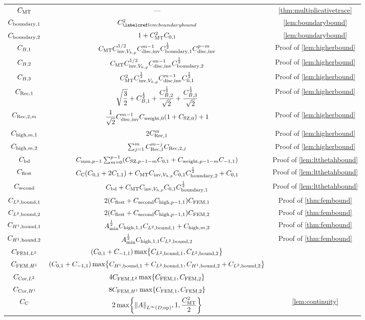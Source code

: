 \begin{longtabu}{ccc}
  $C_{\mathrm{MT}}$ &---&\cref{thm:multiplicativetrace}\\
  $C_{\mathrm{boundary},1}$ & $\Cmess^2$ & \cref{lem:boundarybound} \\
  $C_{\mathrm{boundary},2}$ & $1 + C_{\mathrm{MT}}^2 C_{0,1}$ & \cref{lem:boundarybound}\\
  $C_{B,1}$&$C_{\mathrm{MT}} C_{\mathrm{inv},V_{h,p}}^{1/2} C_{\mathrm{disc},\mathrm{inv}}^{m-1} C_{\mathrm{boundary},1}^{\frac{1}{2}} C_{\mathrm{disc},\mathrm{inv}}^{p-m}$&Proof of \cref{lem:higherbound}\\
  $C_{B,2}$&$C_{\mathrm{MT}} C_{\mathrm{inv},V_{h,p}}^{1/2} C_{\mathrm{disc},\mathrm{inv}}^{m-1} C_{\mathrm{boundary},2}^{\frac{1}{2}}$&Proof of \cref{lem:higherbound}\\
  $C_{B,3}$&$C_{\mathrm{MT}}^2 C_{\mathrm{inv},V_{h,p}}^{\frac{1}{2}} C_{\mathrm{disc},\mathrm{inv}}^{m-1}C_{0,1}^{\frac{1}{2}}$&Proof of \cref{lem:higherbound}\\
  $C_{\mathrm{Rec},1}$&$\displaystyle\sqrt{\frac32} + C_{B,1}^{\frac{1}{2}} + \frac{C_{B,2}^{\frac{1}{2}}}{\sqrt{2}}+ \frac{C_{B,3}^{\frac{1}{2}}}{\sqrt{2}}$&Proof of \cref{lem:higherbound}\\
  $C_{\mathrm{Rec},2,m}$&$\displaystyle\frac1{\sqrt{2}}\Chinv^{m-1}\Cwfn{0}\mleft(1+\CSZfn{0}\mright)+1$&Proof of \cref{lem:higherbound}\\
  $C_{\mathrm{high},m,1}$ & 2$C_{\mathrm{Rec},1}^m$&Proof of \cref{lem:higherbound}\\
  $C_{\mathrm{high},m,2}$ &$\sum_{j=1}^{m}C_{\mathrm{Rec},1}^{m-j} C_{\mathrm{Rec},2,j}$&Proof of \cref{lem:higherbound}\\
  $C_{\mathrm{bd}}$ &$\Csumfn{p-1}\sum_{m=0}^{p-1} \mleft(\CSZfn{p-1-m}\Cfn{0,1} + \Cwfn{p-1-m} \Cfn{-1,1}\mright)$&Proof of \cref{lem:ltthetahbound}\\
  $C_{\mathrm{first}}$ &$\Cc\mleft(\Cfn{0,1} + 2\Cfn{1,1}\mright) + \CMT \CinvVhp \Cfn{0,1} \Cboundaryt^{\half} + \Cfn{0,1}$&Proof of \cref{lem:ltthetahbound}\\
    $C_{\mathrm{second}}$ &$C_{\mathrm{bd}}  + C_{\mathrm{MT}} C_{\mathrm{inv},V_{h,p}} C_{0,1}C_{\mathrm{boundary},1}^{\frac{1}{2}}$&Proof of \cref{lem:ltthetahbound}\\
  $C_{L^{2},\mathrm{bound},1}$&$ 2\mleft(\Cfirst + \Csecond\Chighfn{p-1,1}\mright)\CFEMo$&Proof of \cref{thm:fembound}\\
  $C_{L^{2},\mathrm{bound},2}$&$2\mleft(\Cfirst + \Csecond\Chighfn{p-1,1}\mright)\CFEMt$&Proof of \cref{thm:fembound}\\
  $C_{H^{1},\mathrm{bound},1}$&$A_{\min}^{\frac{1}{2}}C_{\mathrm{high},1,1}C_{L^{2},\mathrm{bound},1}+C_{\mathrm{high},m,2}$&Proof of \cref{thm:fembound}\\
  $C_{H^{1},\mathrm{bound},2}$&$A_{\min}^{\frac{1}{2}}C_{\mathrm{high},1,1}C_{L^{2},\mathrm{bound},2}$&Proof of \cref{thm:fembound}\\
  $C_{\mathrm{FEM},L^{2}}$&$\mleft(\Cfn{0,1} + \Cfn{-1,1}\mright) \max\set{\CLtboundo,\CLtboundt}$&\\
  $C_{\mathrm{FEM},H^{1}}$&$\mleft(\Cfn{0,1} + \Cfn{-1,1}\mright)\max\set{\CHoboundo+\CLtboundo,\CHoboundt+\CLtboundt}$&\\
  $C_{\mathrm{Cor},L^{2}}$&$4\CFEMLt\max\set{\CFEMo,\CFEMt}$&\\
  $C_{\mathrm{Cor},H^{1}}$&$8\CFEMHo\max\set{\CFEMo,\CFEMt}$&\\
  $C_{\mathrm{C}}$&$\displaystyle2\max\set{\NLiDop{A},1,\frac{\CMT^2}2}$&\cref{lem:continuity}\\
\bottomrule
\end{longtabu}
